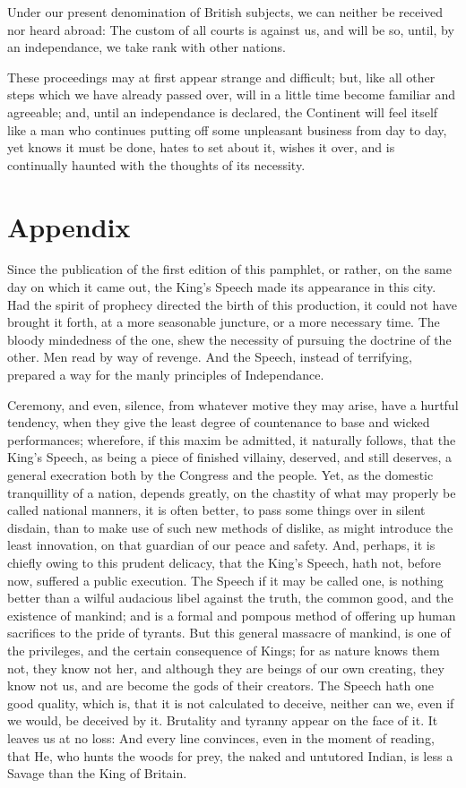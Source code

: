 \documentclass[12pt,oneside]{memoir}
\begin{document}
Under our present denomination of British subjects, we can neither be received nor heard abroad: The custom of all courts is against us, and will be so, until, by an independance, we take rank with other nations.

These proceedings may at first appear strange and difficult; but, like all other steps which we have already passed over, will in a little time become familiar and agreeable; and, until an independance is declared, the Continent will feel itself like a man who continues putting off some unpleasant business from day to day, yet knows it must be done, hates to set about it, wishes it over, and is continually haunted with the thoughts of its necessity.

\backmatter

\section*{Appendix}

Since the publication of the first edition of this pamphlet, or rather, on the same day on which it came out, the King's Speech made its appearance in this city. Had the spirit of prophecy directed the birth of this production, it could not have brought it forth, at a more seasonable juncture, or a more necessary time. The bloody mindedness of the one, shew the necessity of pursuing the doctrine of the other. Men read by way of revenge. And the Speech, instead of terrifying, prepared a way for the manly principles of Independance.

Ceremony, and even, silence, from whatever motive they may arise, have a hurtful tendency, when they give the least degree of countenance to base and wicked performances; wherefore, if this maxim be admitted, it naturally follows, that the King's Speech, as being a piece of finished villainy, deserved, and still deserves, a general execration both by the Congress and the people. Yet, as the domestic tranquillity of a nation, depends greatly, on the chastity of what may properly be called national manners, it is often better, to pass some things over in silent disdain, than to make use of such new methods of dislike, as might introduce the least innovation, on that guardian of our peace and safety. And, perhaps, it is chiefly owing to this prudent delicacy, that the King's Speech, hath not, before now, suffered a public execution. The Speech if it may be called one, is nothing better than a wilful audacious libel against the truth, the common good, and the existence of mankind; and is a formal and pompous method of offering up human sacrifices to the pride of tyrants. But this general massacre of mankind, is one of the privileges, and the certain consequence of Kings; for as nature knows them not, they know not her, and although they are beings of our own creating, they know not us, and are become the gods of their creators. The Speech hath one good quality, which is, that it is not calculated to deceive, neither can we, even if we would, be deceived by it. Brutality and tyranny appear on the face of it. It leaves us at no loss: And every line convinces, even in the moment of reading, that He, who hunts the woods for prey, the naked and untutored Indian, is less a Savage than the King of Britain.
\end{document}
